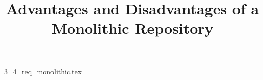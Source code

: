\documentclass{article}      %
\title{Advantages and Disadvantages of a Monolithic Repository}  %
\begin{document}

\maketitle                   %



{3_4_req_monolithic.tex}
\printbibliography
\end{document}
